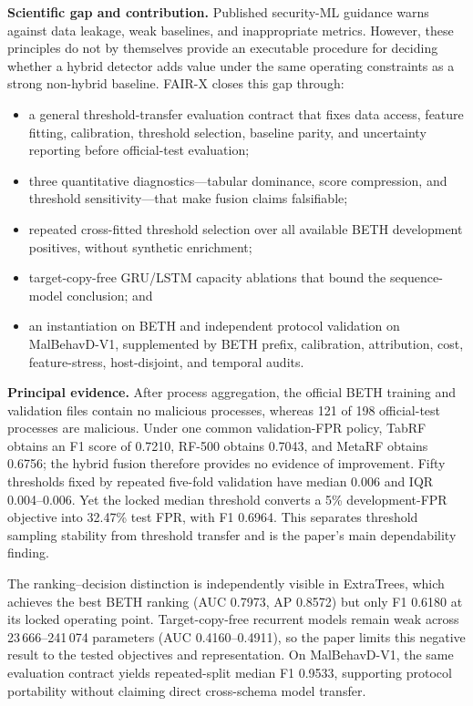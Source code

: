 \documentclass[11pt]{article}
\begin{document}
\textbf{Scientific gap and contribution.}
Published security-ML guidance warns against data leakage, weak baselines, and
inappropriate metrics. However, these principles do not by themselves provide
an executable procedure for deciding whether a hybrid detector adds value
under the same operating constraints as a strong non-hybrid baseline.
FAIR-X closes this gap through:
\begin{itemize}
    \item a general threshold-transfer evaluation contract that fixes data access, feature fitting,
    calibration, threshold selection, baseline parity, and uncertainty
    reporting before official-test evaluation;
    \item three quantitative diagnostics---tabular dominance, score
    compression, and threshold sensitivity---that make fusion claims
    falsifiable;
    \item repeated cross-fitted threshold selection over all available BETH
    development positives, without synthetic enrichment;
    \item target-copy-free GRU/LSTM capacity ablations that bound the
    sequence-model conclusion; and
    \item an instantiation on BETH and independent protocol validation on MalBehavD-V1, supplemented by
    BETH prefix, calibration, attribution, cost, feature-stress,
    host-disjoint, and temporal audits.
\end{itemize}

\newpage

\textbf{Principal evidence.}
After process aggregation, the official BETH training and validation files
contain no malicious processes, whereas 121 of 198 official-test processes
are malicious. Under one common validation-FPR policy, TabRF obtains an F1 score of 0.7210,
RF-500 obtains 0.7043, and MetaRF obtains 0.6756; the hybrid fusion
therefore provides no evidence of improvement. Fifty thresholds fixed by
repeated five-fold validation have median 0.006 and IQR 0.004--0.006. Yet the
locked median threshold converts a 5\% development-FPR objective into 32.47\%
test FPR, with F1 0.6964. This separates threshold sampling stability from
threshold transfer and is the paper's main dependability finding.

The ranking--decision distinction is independently visible in ExtraTrees,
which achieves the best BETH ranking (AUC 0.7973, AP 0.8572) but only F1
0.6180 at its locked operating point. Target-copy-free recurrent models remain
weak across 23\,666--241\,074 parameters (AUC 0.4160--0.4911), so the paper
limits this negative result to the tested objectives and representation. On
MalBehavD-V1, the same evaluation contract yields repeated-split median F1
0.9533, supporting protocol portability without claiming direct cross-schema
model transfer.
\end{document}
